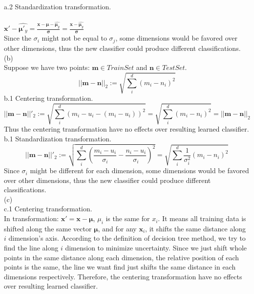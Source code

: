 \documentclass[twoside,11pt]{homework}
\begin{document}
 a.2 Standardization transformation.\\\\
 $\pmb x' - \hat{\pmb\mu'_{y}} = \frac{\pmb{x}- \pmb\mu - \hat{\pmb\mu_{y}}}{\pmb\sigma} = \frac{\pmb{x} - \hat{\pmb\mu_{y}}}{\pmb\sigma}$\\
 Since the $\sigma_i$ might not be equal to $\sigma_j$, some dimensions would be favored over other dimensions, thus the new classifier could produce different classifications. \\

(b)\\ 
Suppose we have two points: $\pmb m \in Train Set$  and $\pmb n \in Test Set$.
\begin{equation}
||\pmb m - \pmb n||_2 := \sqrt{\sum_i^d( m_i -  n_i)^2}
\end{equation}
b.1 Centering transformation. 
\begin{equation}
||\pmb m -  \pmb n||'_2 := \sqrt{\sum_i^d(m_i  - u_i - (m_i - u_i))^2}  = \sqrt{\sum_i^d( m_i -  n_i)^2} = || \pmb  m -  \pmb n||_2
\end{equation}
Thus the centering transformation have no effects over resulting learned classifier. \\

b.1 Standardization transformation. 
\begin{equation}
||\pmb m - \pmb n||'_2 := \sqrt{\sum_i^d(\frac{m_i  - u_i}{\sigma_i} - \frac{n_i  - u_i}{\sigma_i})^2}  = \sqrt{\sum_i^d \frac{1}{\sigma_i^2}( m_i -  n_i)^2} \end{equation}
Since $\sigma_i$ might be different for each dimension, some dimensions would be favored over other dimensions, thus the new classifier could produce different classifications. \\

(c)\\
c.1 Centering transformation. \\
In transformation: $\pmb x' = \pmb{x} - \pmb\mu$, $\mu_i$ is the same for $x_i$. It means all training data is shifted along the same vector $\pmb\mu$, and for any $\pmb{x}_i$, it shifts the same distance along $i$ dimension's axis. According to the definition of decision tree method, we try to find the line along $i$ dimension to minimize uncertainty. Since we just shift whole points in the same distance along each dimension, the relative position of each points is the same, the line we want find just shifts the same distance in each dimensions respectively. Therefore, the centering transformation have no effects over resulting learned classifier. \\
\end{document}
